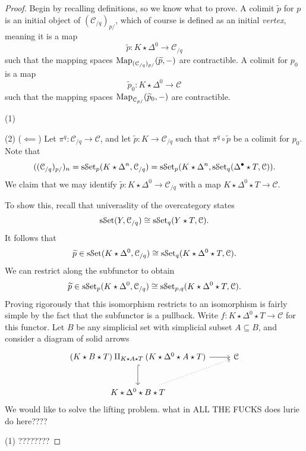 \begin{proof}
	Begin by recalling definitions, so we know what to prove. A colimit $\widetilde{p} $ for $p$ is an initial object of $(\mathcal{C} _{/q} )_{p/} $, which of course is defined as an initial \emph{vertex}, meaning it is a map
	\[
		\widetilde{p} : K\star \Delta ^0 \to \mathcal{C} _{/q} 
	\]
	such that the mapping spaces $\operatorname{Map}_{(\mathcal{C} _{/q})_{p/} }(\widetilde{p} , -) $ are contractible. A colimit for $p_0$ is a map
	\[
		\widetilde{p} _0 : K\star \Delta ^0 \to \mathcal{C} 
	\]
	such that the mapping spaces $\operatorname{Map}_{\mathcal{C} _{p/} }(\widetilde{p} _0, -) $ are contractible.

	(1)

	(2) ($\impliedby $) Let $\pi^q : \mathcal{C} _{/q}  \to \mathcal{C} $, and let $\widetilde{p} : K \to \mathcal{C}_{/q} $ such that $\pi ^q\circ \widetilde{p} $ be a colimit for $p_0$. Note that
	\[
		((\mathcal{C}_{/q} )_{p/} )_n=\mathrm{s}\mathcal{S}\mathrm{et} _p(K\star \Delta ^n,\mathcal{C} _{/q} )=\mathrm{s}\mathcal{S}\mathrm{et}_p(K\star \Delta ^n,\mathrm{s}\mathcal{S}\mathrm{et} _q(\Delta^{\bullet}  \star T,\mathcal{C} ))
	.\]
	We claim that we may identify $\widetilde{p} : K\star \Delta ^0 \to \mathcal{C} _{/q} $ with a map $K\star \Delta ^0\star T\to \mathcal{C} $.

	To show this, recall that univeraslity of the overcategory states
	\[
		\mathrm{s}\mathcal{S}\mathrm{et} (Y,\mathcal{C} _{/q} )\cong \mathrm{s}\mathcal{S}\mathrm{et}_q(Y\star T,\mathcal{C} )
	.\]
	It follows that
	\[
		\widetilde{p} \in\mathrm{s}\mathcal{S}\mathrm{et} (K\star \Delta ^0,\mathcal{C}_{/q} )\cong \mathrm{s}\mathcal{S}\mathrm{et}_q(K\star \Delta ^0 \star T,\mathcal{C} )
	.\]
	We can restrict along the subfunctor to obtain
	\[
		\widetilde{p} \in \mathrm{s}\mathcal{S}\mathrm{et} _p(K\star \Delta ^0,\mathcal{C} _{/q} )\cong \mathrm{s}\mathcal{S}\mathrm{et} _{p,q} (K\star \Delta ^0\star T,\mathcal{C} )
	.\]
	Proving rigorously that this isomorphism restricts to an isomorphism is fairly simple by the fact that the subfunctor is a pullback. Write $f : K\star \Delta ^0\star T \to \mathcal{C} $ for this functor. Let $B$ be any simplicial set with simplicial subset $A\subseteq B$, and consider a diagram of solid arrows
	\[\begin{tikzcd}[row sep = 2.5em, column sep = 2.5em]
		(K\star B\star T)\amalg_{K\star A\star T} (K\star \Delta ^0\star A\star T)\ar[r] \ar[hook, d]  & \mathcal{C}  \\
	K\star \Delta ^0 \star B\star T \ar[dotted, ur] & 
	\end{tikzcd}\]
	We would like to solve the lifting problem. what in ALL THE FUCKS does lurie do here????

	(1) ????????
\end{proof}

